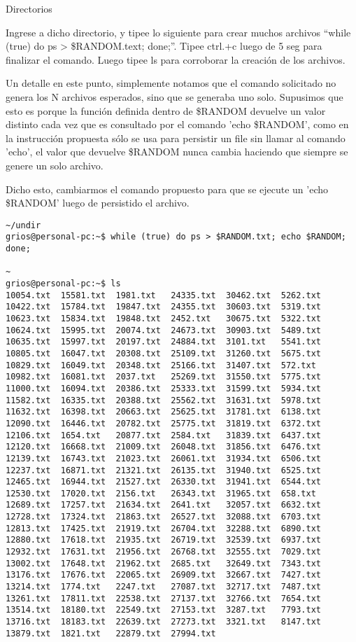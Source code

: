 \begin{section}{Directorios}
\begin{quoting}
Ingrese a dicho directorio, y tipee lo siguiente para crear muchos archivos “while (true) do ps >
\$RANDOM.text; done;”. Tipee ctrl.+c luego de 5 seg para finalizar el comando. Luego tipee ls para
corroborar la creación de los archivos.
\end{quoting}

Un detalle en este punto, simplemente notamos que el comando solicitado no genera los N archivos esperados, sino que se generaba uno solo. Supusimos que esto es porque la función definida dentro de \$RANDOM devuelve un valor distinto cada vez que es consultado por el comando 'echo \$RANDOM', como en la instrucción propuesta sólo se usa para persistir un file sin llamar al comando 'echo', el valor que devuelve \$RANDOM nunca cambia haciendo que siempre se genere un solo archivo.

Dicho esto, cambiarmos el comando propuesto para que se ejecute un 'echo \$RANDOM' luego de persistido el archivo.

\begin{lstlisting}[style=Ubuntu]
~/undir
grios@personal-pc:~$ while (true) do ps > $RANDOM.txt; echo $RANDOM; done;

~
grios@personal-pc:~$ ls
10054.txt  15581.txt  1981.txt   24335.txt  30462.txt  5262.txt
10422.txt  15784.txt  19847.txt  24355.txt  30603.txt  5319.txt
10623.txt  15834.txt  19848.txt  2452.txt   30675.txt  5322.txt
10624.txt  15995.txt  20074.txt  24673.txt  30903.txt  5489.txt
10635.txt  15997.txt  20197.txt  24884.txt  3101.txt   5541.txt
10805.txt  16047.txt  20308.txt  25109.txt  31260.txt  5675.txt
10829.txt  16049.txt  20348.txt  25166.txt  31407.txt  572.txt
10982.txt  16081.txt  2037.txt   25269.txt  31550.txt  5775.txt
11000.txt  16094.txt  20386.txt  25333.txt  31599.txt  5934.txt
11582.txt  16335.txt  20388.txt  25562.txt  31631.txt  5978.txt
11632.txt  16398.txt  20663.txt  25625.txt  31781.txt  6138.txt
12090.txt  16446.txt  20782.txt  25775.txt  31819.txt  6372.txt
12106.txt  1654.txt   20877.txt  2584.txt   31839.txt  6437.txt
12120.txt  16668.txt  21009.txt  26048.txt  31856.txt  6476.txt
12139.txt  16743.txt  21023.txt  26061.txt  31934.txt  6506.txt
12237.txt  16871.txt  21321.txt  26135.txt  31940.txt  6525.txt
12465.txt  16944.txt  21527.txt  26330.txt  31941.txt  6544.txt
12530.txt  17020.txt  2156.txt   26343.txt  31965.txt  658.txt
12689.txt  17257.txt  21634.txt  2641.txt   32057.txt  6632.txt
12728.txt  17324.txt  21863.txt  26527.txt  32088.txt  6703.txt
12813.txt  17425.txt  21919.txt  26704.txt  32288.txt  6890.txt
12880.txt  17618.txt  21935.txt  26719.txt  32539.txt  6937.txt
12932.txt  17631.txt  21956.txt  26768.txt  32555.txt  7029.txt
13002.txt  17648.txt  21962.txt  2685.txt   32649.txt  7343.txt
13176.txt  17676.txt  22065.txt  26909.txt  32667.txt  7427.txt
13214.txt  1774.txt   2247.txt   27087.txt  32717.txt  7487.txt
13261.txt  17811.txt  22538.txt  27137.txt  32766.txt  7654.txt
13514.txt  18180.txt  22549.txt  27153.txt  3287.txt   7793.txt
13716.txt  18183.txt  22639.txt  27273.txt  3321.txt   8147.txt
13879.txt  1821.txt   22879.txt  27994.txt  
\end{lstlisting}



\end{section}
